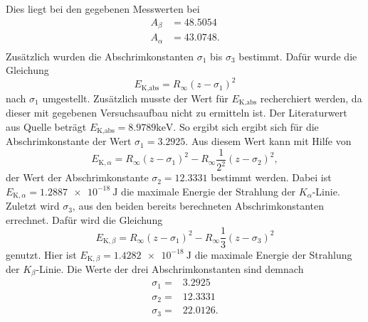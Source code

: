 Dies liegt bei den gegebenen Messwerten bei 
\begin{align*}
    A_\beta &= 48.5054 \\
    A_\alpha &=  43.0748. \\
\end{align*}
Zusätzlich wurden die Abschrimkonstanten $\sigma_1$ bis $\sigma_3$ bestimmt.
Dafür wurde die Gleichung
\begin{equation*}
  E_\text{K,abs} = R_\infty (z-\sigma_1)^2
  \label{eq:sigma1}
\end{equation*}
nach $\sigma_1$ umgestellt.
Zusätzlich musste der Wert für $E_\text{K,abs}$ recherchiert werden, da dieser mit gegebenen Versuchsaufbau nicht zu ermitteln ist.
Der Literaturwert aus Quelle \cite{xray} beträgt $E_\text{K,abs} = 8.9789 \si{\kilo\eV}$. 
So ergibt sich ergibt sich für die Abschrimkonstante der Wert $\sigma_1 = 3.2925$.
Aus diesem Wert kann mit Hilfe von
\begin{equation*}
  E_{\text{K},\alpha} = R_\infty (z-\sigma_1)^2 - R_\infty \frac{1}{2^2}(z-\sigma_2)^2,
\end{equation*}
der Wert der Abschrimkonstante $\sigma_2 = 12.3331$ bestimmt werden.
Dabei ist $E_{\text{K},\alpha} = \SI{1.2887e-18}{\joule}$ die maximale Energie der Strahlung der $K_\alpha$-Linie.
Zuletzt wird $\sigma_3$, aus den beiden bereits berechneten Abschrimkonstanten errechnet.
Dafür wird die Gleichung 
\begin{equation*}
  E_{\text{K},\beta} = R_\infty (z-\sigma_1)^2 - R_\infty \frac{1}{3}(z-\sigma_3)^2
\end{equation*}
genutzt.
Hier ist $E_{\text{K},\beta} = \SI{1.4282e-18}{\joule}$ die maximale Energie der Strahlung der $K_\beta$-Linie.
Die Werte der drei Abschrimkonstanten sind demnach 
\begin{align*}
\sigma_1 =& 3.2925 \\
\sigma_2 =& 12.3331 \\
\sigma_3 =& 22.0126. \\
\end{align*}

